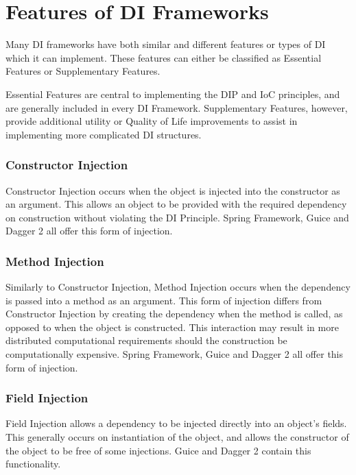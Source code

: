 \documentclass[12pt,twocolumn]{IEEEtran}
\begin{document}
\section{Features of DI Frameworks} \label{sec:features}
Many DI frameworks have both similar and different features or types of DI which it can implement. These features can either be classified as Essential Features or Supplementary Features.

Essential Features are central to implementing the DIP and IoC principles, and are generally included in every DI Framework. Supplementary Features, however, provide additional utility or Quality of Life improvements to assist in implementing more complicated DI structures. 


\subsubsection{Constructor Injection} %

Constructor Injection occurs when the object is injected into the constructor as an argument. This allows an object to be provided with the required dependency on construction without violating the DI Principle. Spring Framework, Guice and Dagger 2 all offer this form of injection. 

\subsubsection{Method Injection} %

Similarly to Constructor Injection, Method Injection occurs when the dependency is passed into a method as an argument. This form of injection differs from Constructor Injection by creating the dependency when the method is called, as opposed to when the object is constructed. This interaction may result in more distributed computational requirements should the construction be computationally expensive. Spring Framework, Guice and Dagger 2 all offer this form of injection. 

\subsubsection{Field Injection} %

Field Injection allows a dependency to be injected directly into an object's fields. This generally occurs on instantiation of the object, and allows the constructor of the object to be free of some injections. Guice and Dagger 2 contain this functionality.
\end{document}

